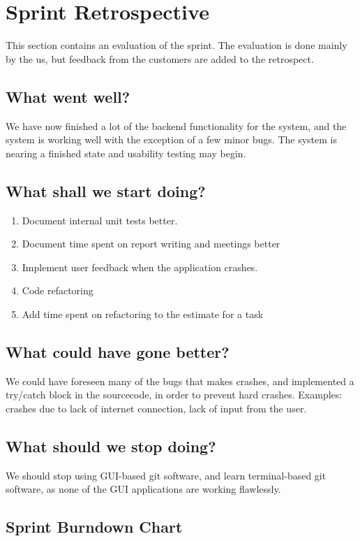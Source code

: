 \section{Sprint Retrospective}
\label{sec:sprint4sprintRetrospective}
This section contains an evaluation of the sprint. The evaluation is done mainly by the us, but feedback from the customers are added to the retrospect.

\subsection{What went well?}
We have now finished a lot of the backend functionality for the system, and the system 
is working well with the exception of a few minor bugs. The system is nearing a finished 
state and usability testing may begin. 

\subsection{What shall we start doing?}
\begin{enumerate}
  \item Document internal unit tests better.
  \item Document time spent on report writing and meetings better
  \item Implement user feedback when the application crashes.
  \item Code refactoring
  \item Add time spent on refactoring to the estimate for a task
\end{enumerate}

\subsection{What could have gone better?}
We could have foreseen many of the bugs that makes crashes, and implemented a try/catch 
block in the sourcecode, in order to prevent hard crashes. Examples: crashes due to lack 
of internet connection, lack of input from the user.

\subsection{What should we stop doing?}
We should stop using GUI-based git software, and learn terminal-based git software, as none of the GUI applications are working flawlessly.

\subsection{Sprint Burndown Chart}

